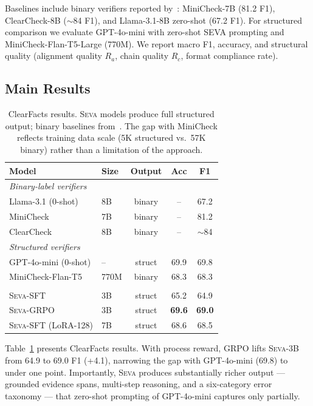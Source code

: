 \documentclass{article}
\newcommand{\seva}{\textsc{Seva}\xspace}
\newcommand{\realnumber}[1]{\textbf{#1}}
\begin{document}
Baselines include binary verifiers reported by~\citet{seo2025vtv}: MiniCheck-7B (81.2 F1), ClearCheck-8B ($\sim$84 F1), and Llama-3.1-8B zero-shot (67.2 F1).
For structured comparison we evaluate GPT-4o-mini with zero-shot SEVA prompting and MiniCheck-Flan-T5-Large (770M).
We report macro F1, accuracy, and structural quality (alignment quality $R_a$, chain quality $R_c$, format compliance rate).


\subsection{Main Results}

\begin{table}[t]
\centering
\small
\caption{ClearFacts results. \seva models produce full structured output; binary baselines from~\citet{seo2025vtv}. The gap with MiniCheck reflects training data scale (5K structured vs.\ 57K binary) rather than a limitation of the approach.}
\label{tab:main}
\setlength{\tabcolsep}{3pt}
\begin{tabular}{llccc}
\toprule
\textbf{Model} & \textbf{Size} & \textbf{Output} & \textbf{Acc} & \textbf{F1} \\
\midrule
\multicolumn{5}{l}{\textit{Binary-label verifiers}} \\
Llama-3.1 (0-shot) & 8B & binary & -- & 67.2 \\
MiniCheck & 7B & binary & -- & 81.2 \\
ClearCheck & 8B & binary & -- & $\sim$84 \\
\midrule
\multicolumn{5}{l}{\textit{Structured verifiers}} \\
GPT-4o-mini (0-shot) & -- & struct & 69.9 & 69.8 \\
MiniCheck-Flan-T5 & 770M & binary & 68.3 & 68.3 \\
\hdashline
\multicolumn{5}{l}{\textit{Ours}} \\
\seva-SFT & 3B & struct & 65.2 & 64.9 \\
\seva-GRPO & 3B & struct & \realnumber{69.6} & \realnumber{69.0} \\
\hdashline
\seva-SFT (LoRA-128) & 7B & struct & 68.6 & 68.5 \\
\bottomrule
\end{tabular}
\end{table}

Table~\ref{tab:main} presents ClearFacts results.
With process reward, GRPO lifts \seva-3B from 64.9 to 69.0 F1 (+4.1), narrowing the gap with GPT-4o-mini (69.8) to under one point.
Importantly, \seva produces substantially richer output --- grounded evidence spans, multi-step reasoning, and a six-category error taxonomy --- that zero-shot prompting of GPT-4o-mini captures only partially.
\end{document}
